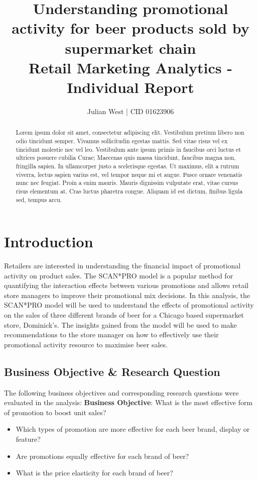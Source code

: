 \documentclass[a4paper,11pt]{article}
\title{Understanding promotional activity for beer products sold by supermarket chain  \\
\addlinespace
\large Retail Marketing Analytics - Individual Report }
\author{Julian West | CID 01623906}
\begin{document}
\maketitle

\begin{abstract}
Lorem ipsum dolor sit amet, consectetur adipiscing elit. Vestibulum pretium libero non odio tincidunt semper. Vivamus sollicitudin egestas mattis. Sed vitae risus vel ex tincidunt molestie nec vel leo. Vestibulum ante ipsum primis in faucibus orci luctus et ultrices posuere cubilia Curae; Maecenas quis massa tincidunt, faucibus magna non, fringilla sapien. In ullamcorper justo a scelerisque egestas. Ut maximus, elit a rutrum viverra, lectus sapien varius est, vel tempor neque mi et augue. Fusce ornare venenatis nunc nec feugiat. Proin a enim mauris. Mauris dignissim vulputate erat, vitae cursus risus elementum at. Cras luctus pharetra congue. Aliquam id est dictum, finibus ligula sed, tempus arcu. 
\end{abstract} \hspace{10pt}

\newpage
\tableofcontents
\newpage

\section{Introduction}
Retailers are interested in understanding the financial impact of promotional activity on product sales. The SCAN*PRO model is a popular method for quantifying the interaction effects between various promotions and allows retail store managers to improve their promotional mix decisions. In this analysis, the SCAN*PRO model will be used to understand the effects of promotional activity on the sales of three different brands of beer for a Chicago based supermarket store, Dominick's. The insights gained from the model will be used to make recommendations to the store manager on how to effectively use their promotional activity resource to maximise beer sales.

\subsection{Business Objective \& Research Question}
The following business objectives and corresponding research questions were evaluated in the analysis:
\newline
\newline
\textbf{Business Objective}: What is the most effective form of promotion to boost unit sales?
\begin{itemize}
        \item Which types of promotion are more effective for each beer brand, display or feature?
        \item Are promotions equally effective for each brand of beer?
        \item What is the price elasticity for each brand of beer?
\end{itemize}
\newline
\newline
\end{document}
